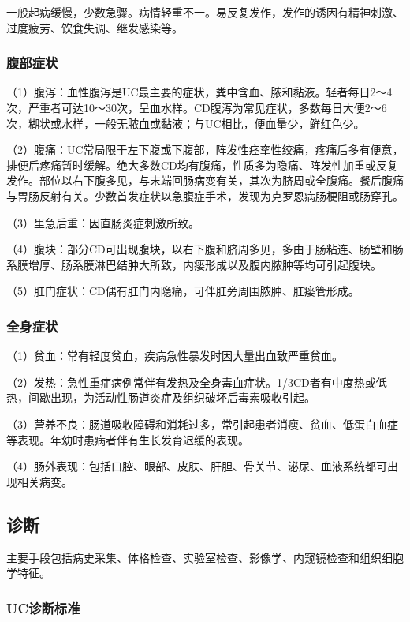 一般起病缓慢，少数急骤。病情轻重不一。易反复发作，发作的诱因有精神刺激、过度疲劳、饮食失调、继发感染等。

\subsubsection{腹部症状}

（1）腹泻：血性腹泻是UC最主要的症状，粪中含血、脓和黏液。轻者每日2～4次，严重者可达10～30次，呈血水样。CD腹泻为常见症状，多数每日大便2～6次，糊状或水样，一般无脓血或黏液；与UC相比，便血量少，鲜红色少。

（2）腹痛：UC常局限于左下腹或下腹部，阵发性痉挛性绞痛，疼痛后多有便意，排便后疼痛暂时缓解。绝大多数CD均有腹痛，性质多为隐痛、阵发性加重或反复发作。部位以右下腹多见，与末端回肠病变有关，其次为脐周或全腹痛。餐后腹痛与胃肠反射有关。少数首发症状以急腹症手术，发现为克罗恩病肠梗阻或肠穿孔。

（3）里急后重：因直肠炎症刺激所致。

（4）腹块：部分CD可出现腹块，以右下腹和脐周多见，多由于肠粘连、肠壁和肠系膜增厚、肠系膜淋巴结肿大所致，内瘘形成以及腹内脓肿等均可引起腹块。

（5）肛门症状：CD偶有肛门内隐痛，可伴肛旁周围脓肿、肛瘘管形成。

\subsubsection{全身症状}

（1）贫血：常有轻度贫血，疾病急性暴发时因大量出血致严重贫血。

（2）发热：急性重症病例常伴有发热及全身毒血症状。1/3CD者有中度热或低热，间歇出现，为活动性肠道炎症及组织破坏后毒素吸收引起。

（3）营养不良：肠道吸收障碍和消耗过多，常引起患者消瘦、贫血、低蛋白血症等表现。年幼时患病者伴有生长发育迟缓的表现。

（4）肠外表现：包括口腔、眼部、皮肤、肝胆、骨关节、泌尿、血液系统都可出现相关病变。

\subsection{诊断}

主要手段包括病史采集、体格检查、实验室检查、影像学、内窥镜检查和组织细胞学特征。

\subsubsection{UC诊断标准}

